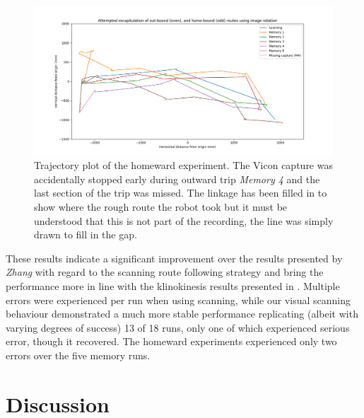 \documentclass[a4paper,12pt,twoside,openright]{article}
\begin{document}
\begin{figure}
 \centering
  \includegraphics[width=\textwidth]{Homeward}
  \caption{
    \label{fig:home} Trajectory plot of the homeward experiment. The Vicon capture was accidentally stopped
    early during outward trip \textit{Memory 4} and the last section of the trip was missed. The linkage has
    been filled in to show where the rough route the robot took but it must be understood that this is not
    part of the recording, the line was simply drawn to fill in the gap. 
  }
\end{figure}

These results indicate a significant improvement over the results presented by \textit{Zhang} with regard to the
scanning route following strategy and bring the performance more in line with the klinokinesis results presented in
\cite{Zhang2017}. Multiple errors were experienced per run when using scanning, while our visual scanning behaviour
demonstrated a much more stable performance replicating (albeit with varying degrees of success) 13 of 18 runs, only one of
which experienced serious error, though it recovered. The homeward experiments experienced only two errors over the five memory runs.
\newpage

\section{ Discussion } \label{sec:discussion}
\end{document}

